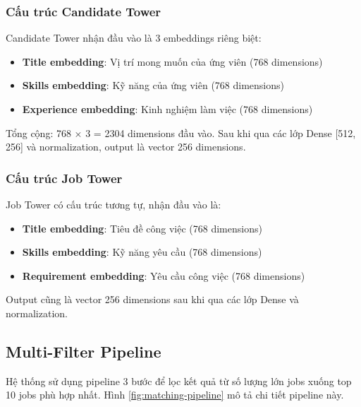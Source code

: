 \subsubsection{Cấu trúc Candidate Tower}

Candidate Tower nhận đầu vào là 3 embeddings riêng biệt:
\begin{itemize}
    \item \textbf{Title embedding}: Vị trí mong muốn của ứng viên (768 dimensions)
    \item \textbf{Skills embedding}: Kỹ năng của ứng viên (768 dimensions)
    \item \textbf{Experience embedding}: Kinh nghiệm làm việc (768 dimensions)
\end{itemize}

Tổng cộng: 768 × 3 = 2304 dimensions đầu vào. Sau khi qua các lớp Dense [512, 256] và normalization, output là vector 256 dimensions.

\subsubsection{Cấu trúc Job Tower}

Job Tower có cấu trúc tương tự, nhận đầu vào là:
\begin{itemize}
    \item \textbf{Title embedding}: Tiêu đề công việc (768 dimensions)
    \item \textbf{Skills embedding}: Kỹ năng yêu cầu (768 dimensions)
    \item \textbf{Requirement embedding}: Yêu cầu công việc (768 dimensions)
\end{itemize}

Output cũng là vector 256 dimensions sau khi qua các lớp Dense và normalization.

\subsection{Multi-Filter Pipeline}

Hệ thống sử dụng pipeline 3 bước để lọc kết quả từ số lượng lớn jobs xuống top 10 jobs phù hợp nhất. Hình \ref{fig:matching-pipeline} mô tả chi tiết pipeline này.


